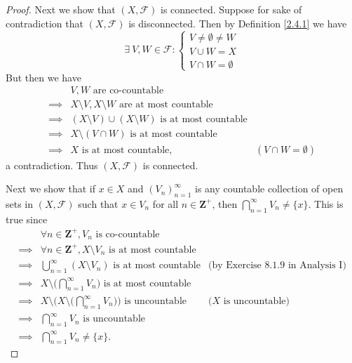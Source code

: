 \begin{proof}
    Next we show that \((X, \mathcal{F})\) is connected.
    Suppose for sake of contradiction that \((X, \mathcal{F})\) is disconnected.
    Then by Definition \ref{2.4.1} we have
    \[
        \exists\ V, W \in \mathcal{F} : \begin{cases}
            V \neq \emptyset \neq W \\
            V \cup W = X            \\
            V \cap W = \emptyset
        \end{cases}
    \]
    But then we have
    \begin{align*}
                 & V, W \text{ are co-countable}                                                              \\
        \implies & X \setminus V, X \setminus W \text{ are at most countable}                                 \\
        \implies & (X \setminus V) \cup (X \setminus W) \text{ is at most countable}                          \\
        \implies & X \setminus (V \cap W) \text{ is at most countable}                                        \\
        \implies & X \text{ is at most countable},                                   & (V \cap W = \emptyset)
    \end{align*}
    a contradiction.
    Thus \((X, \mathcal{F})\) is connected.

    Next we show that if \(x \in X\) and \((V_n)_{n = 1}^\infty\) is any countable collection of open sets in \((X, \mathcal{F})\) such that \(x \in V_n\) for all \(n \in \mathbf{Z}^+\), then \(\bigcap_{n = 1}^\infty V_n \neq \{x\}\).
    This is true since
    \begin{align*}
                 & \forall n \in \mathbf{Z}^+, V_n \text{ is co-countable}                                                                                      \\
        \implies & \forall n \in \mathbf{Z}^+, X \setminus V_n \text{ is at most countable}                                                                     \\
        \implies & \bigcup_{n = 1}^\infty (X \setminus V_n) \text{ is at most countable}                             & \text{(by Exercise 8.1.9 in Analysis I)} \\
        \implies & X \setminus \bigg(\bigcap_{n = 1}^\infty V_n\bigg) \text{ is at most countable}                                                              \\
        \implies & X \setminus \Bigg(X \setminus \bigg(\bigcap_{n = 1}^\infty V_n\bigg)\Bigg) \text{ is uncountable} & \text{(\(X\) is uncountable)}            \\
        \implies & \bigcap_{n = 1}^\infty V_n \text{ is uncountable}                                                                                            \\
        \implies & \bigcap_{n = 1}^\infty V_n \neq \{x\}.
    \end{align*}


\end{proof}
